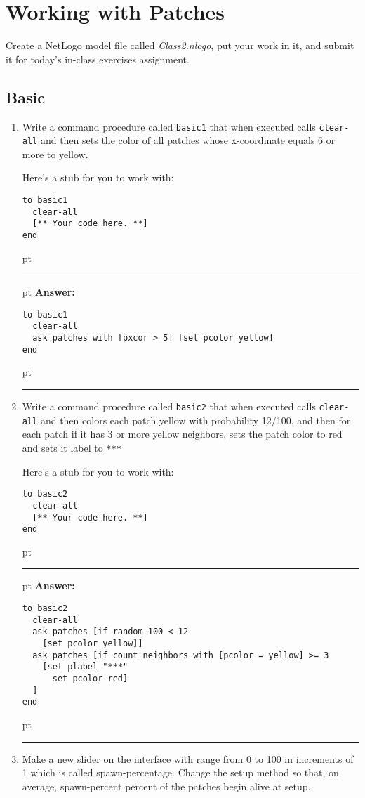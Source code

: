 \documentclass[11pt]{book}
\begin{document}
\chapter{Working with Patches}

Create a NetLogo model file called {\it Class2.nlogo}, put your work in it, and submit it for today's in-class exercises assignment.

\section{Basic}

\begin{enumerate}
\item Write a command procedure called \texttt{basic1} that when executed calls \texttt{clear-all} and then sets the color of all patches whose x-coordinate equals 6 or more to yellow. 

Here's a stub for you to work with:
\begin{verbatim}
to basic1
  clear-all
  [** Your code here. **]
end
\end{verbatim}


\ifnum{}
 pt
\hrule
{} pt
{\bf Answer: }
\begin{verbatim}
to basic1
  clear-all
  ask patches with [pxcor > 5] [set pcolor yellow]
end
\end{verbatim}
 pt
\hrule
\fi

\item Write a command procedure called \texttt{basic2} that when executed calls \texttt{clear-all} and then colors each patch yellow with probability 12/100, and then for each patch if it has 3 or more yellow neighbors, sets the patch color to red and sets it label to \texttt{***}

Here's a stub for you to work with:
\begin{verbatim}
to basic2
  clear-all
  [** Your code here. **]
end
\end{verbatim}

\ifnum{}
 pt
\hrule
{} pt
{\bf Answer: }
\begin{verbatim}
to basic2
  clear-all
  ask patches [if random 100 < 12
    [set pcolor yellow]]
  ask patches [if count neighbors with [pcolor = yellow] >= 3
    [set plabel "***"
      set pcolor red]
  ] 
end
\end{verbatim}
 pt
\hrule
\fi

\item Make a new slider on the interface with range from 0 to 100 in increments of 1 which is called spawn-percentage. Change the setup method so that, on average, spawn-percent percent of the patches begin alive at setup.


\end{enumerate}
\end{document}
